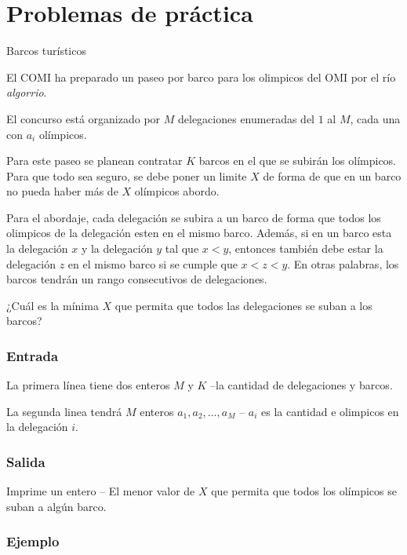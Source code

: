 \section*{Problemas de práctica}

\problemtitle Barcos turísticos

El COMI ha preparado un paseo por barco para los olimpicos del OMI por el río \textit{algorrio}. 

El concurso está organizado por \(M\) delegaciones enumeradas del \(1\) al \(M\), cada una con \(a_i\) olímpicos.

Para este paseo se planean contratar \(K\) barcos en el que se subirán los olímpicos. Para que todo sea seguro, se debe poner un limite \(X\) de forma de que en un barco no pueda haber más de \(X\)  olímpicos abordo.

Para el abordaje, cada delegación se subira a un barco de forma que todos los olimpicos de la delegación esten en el mismo barco. Además, si en un barco esta la delegación \(x\) y la delegación \(y\) tal que \(x < y\), entonces también debe estar la delegación \(z\) en el mismo barco si se cumple que \(x < z < y\). En otras palabras, los barcos tendrán un rango consecutivos de delegaciones.

¿Cuál es la mínima \(X\) que permita que todos las delegaciones se suban a los barcos?

\subsubsection*{Entrada}
La primera línea tiene dos enteros \(M\) y \(K\) --la cantidad de delegaciones y barcos.

La segunda linea tendrá \(M\) enteros \(a_1, a_2, \ldots, a_M\) -- \(a_i\) es la cantidad e olimpicos en la delegación \(i\).

\subsubsection*{Salida}
Imprime un entero -- El menor valor de \(X\) que permita que todos los olímpicos se suban a algún barco.

\subsubsection*{Ejemplo}
\begin{casebox3}
\end{casebox3}
